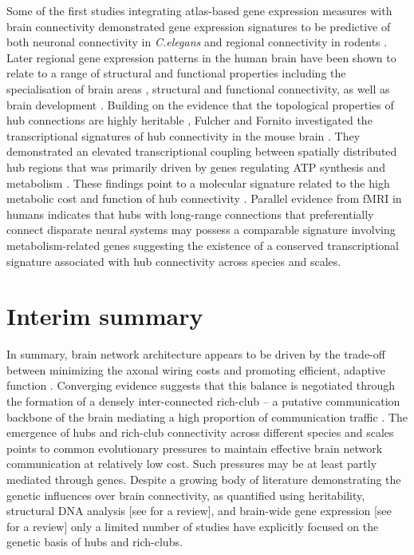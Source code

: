 Some of the first studies integrating atlas-based gene expression measures with brain connectivity demonstrated gene expression signatures to be predictive of both neuronal connectivity in \textit{C.elegans}
\citep{Kaufman2006} and regional connectivity in rodents \citep{Fakhry2015,Fakhry2015a,Ji2014}. Later regional gene expression patterns in the human brain have been shown to relate to a range of structural and functional properties including the specialisation of brain areas \citep{Anderson2018,Krienen2016,Parkes2017}, structural
\citep{Goel2014} and functional \citep{Cioli2014b,Forest2017,Richiardi2015,Vertes2016b} connectivity, as well as brain development \citep{Kirsch2016a,Whitaker2016a}. Building on the evidence that the topological properties of hub connections are highly heritable \citep{Fornito2011}, Fulcher and Fornito investigated the transcriptional signatures of hub connectivity in the mouse brain \citep{Fulcher2016}. They demonstrated an elevated transcriptional coupling between spatially distributed hub regions that was primarily driven by genes regulating ATP synthesis and metabolism \citep{Fulcher2016}. These findings point to a molecular signature related to the high metabolic cost and function of hub connectivity  \citep{Liang2013a,Tomasi2013}. Parallel evidence from fMRI in humans indicates that hubs with long-range connections that preferentially connect disparate neural systems may possess a comparable signature involving metabolism-related genes \citep{Vertes2016b} suggesting the existence of a conserved transcriptional signature associated with hub connectivity across species and scales.

\section{Interim summary}

In summary, brain network architecture appears to be driven by the trade-off between minimizing the axonal wiring costs and promoting efficient, adaptive function \citep{Bullmore2012}. Converging evidence suggests that this balance is negotiated through the formation of a densely inter-connected rich-club -- a putative communication backbone of the brain mediating a high proportion of communication traffic \citep{VandenHeuvel2011}. The emergence of hubs and rich-club connectivity across different species and scales points to common evolutionary pressures to maintain effective brain network communication at relatively low cost. Such pressures may be at least partly mediated through genes. Despite a growing body of literature demonstrating the genetic influences over brain connectivity, as quantified using heritability, structural DNA analysis [see \citet{Thompson2013} for a review], and brain-wide gene expression [see \citet{Fornito2019} for a review] only a limited number of studies have explicitly focused on the genetic basis of hubs and rich-clubs.

